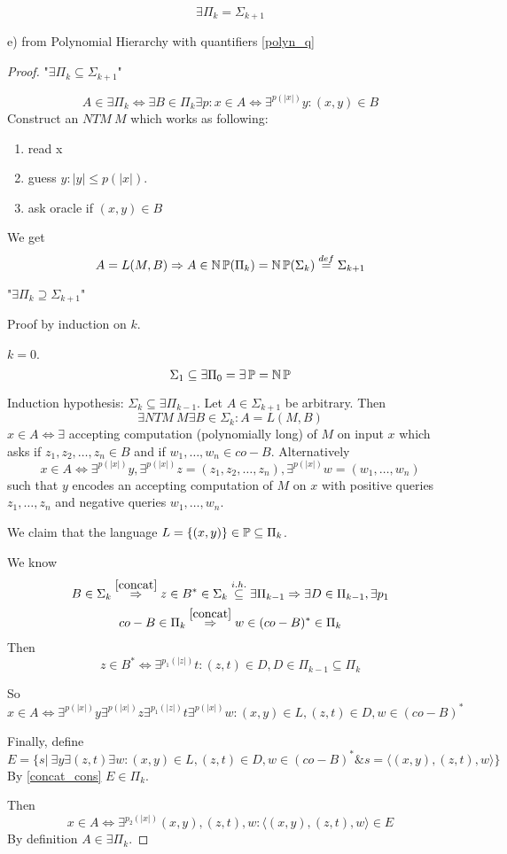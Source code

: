 \begin{theorem}
	\[ \exists \Pi_k = \Sigma_{k + 1} \]

	e) from Polynomial Hierarchy with quantifiers \cref{polyn_q}
\end{theorem}
\begin{proof}
	"$\exists \Pi_k \subseteq \Sigma_{k + 1}$"

	\[ A \in \exists \Pi_k \iff \exists B \in \Pi_k \exists p: x \in A \iff \exists^{p(|x|)} y: (x,y) \in B \]
	Construct an $NTM\ M$ which works as following:
	\begin{enumerate}
		\item read x
		\item guess $y: |y| \leq p(|x|)$.
		\item ask oracle if $(x,y) \in B$
	\end{enumerate}

	We get
	\[ A = L(M, B) \Rightarrow A \in \operatorname{\operatorname{\mathbb{N}}\mathbb{P}}(\Pi_k) = \operatorname{\operatorname{\mathbb{N}}\mathbb{P}}(\Sigma_k) \stackrel{def}{=} \Sigma_{k + 1} \]

	"$\exists \Pi_k \supseteq \Sigma_{k + 1}$"

	Proof by induction on $k$.

	$k = 0$.
	\[ \Sigma_1 \subseteq \exists \Pi_0 = \exists \operatorname{\mathbb{P}} = \operatorname{\operatorname{\mathbb{N}}\mathbb{P}} \]

	Induction hypothesis: $\Sigma_k \subseteq \exists \Pi_{k - 1}$.
	Let $A \in \Sigma_{k + 1}$ be arbitrary.
	Then
	\[ \exists NTM\ M \exists B \in \Sigma_k: A = L(M, B) \]
	$x \in A \iff \exists$ accepting computation (polynomially long) of $M$ on input $x$ which asks if $z_1, z_2, \ldots, z_n \in B$ and if $w_1, \ldots, w_n \in co-B$.
	Alternatively
	\[ x \in A \iff \exists^{p(|x|)} y, \exists^{p(|x|)} z = (z_1, z_2, \ldots, z_n), \exists^{p(|x|)} w = (w_1, \ldots, w_n)\]
	such that $y$ encodes an accepting computation of $M$ on $x$ with positive queries $z_1, \ldots, z_n$ and negative queries $w_1, \ldots, w_n$.

	We claim that the language $L = \{ (x, y) \} \in \operatorname{\mathbb{P}} \subseteq \Pi_k$.

	We know
	\begin{gather*}
		B \in \Sigma_k \stackrel{\cref{concat}}{\Rightarrow} z \in B^{\ast} \in \Sigma_k \stackrel{i.h.}{\subseteq} \exists \Pi_{k - 1} \Rightarrow \exists D \in \Pi_{k - 1}, \exists p_1 \\
		co-B \in \Pi_k \stackrel{\cref{concat}}{\Rightarrow} w \in (co-B)^{\ast} \in \Pi_k
	\end{gather*}
	Then
	\[ z \in B^{\ast} \iff \exists^{p_1(|z|)} t: (z, t) \in D, D \in \Pi_{k - 1} \subseteq \Pi_k \]

	So
	\[x \in A \iff \exists^{p(|x|)} y \exists^{p(|x|)} z \exists^{p_1(|z|)} t \exists^{p(|x|)} w : (x, y) \in L, (z, t) \in D, w \in (co-B)^{\ast} \]

	Finally, define
	\[ E = \{ s |\ \exists y \exists (z, t) \exists w: (x, y) \in L, (z, t) \in D, w \in (co-B)^{\ast} \& s = \langle (x, y), (z, t), w \rangle \} \]
	By \cref{concat_cons} $E \in \Pi_k$.

	Then
	\[x \in A \iff \exists^{p_2(|x|)} (x, y), (z, t), w: \langle (x, y), (z, t), w \rangle \in E \]
	By definition $A \in \exists \Pi_k$.
\end{proof}

